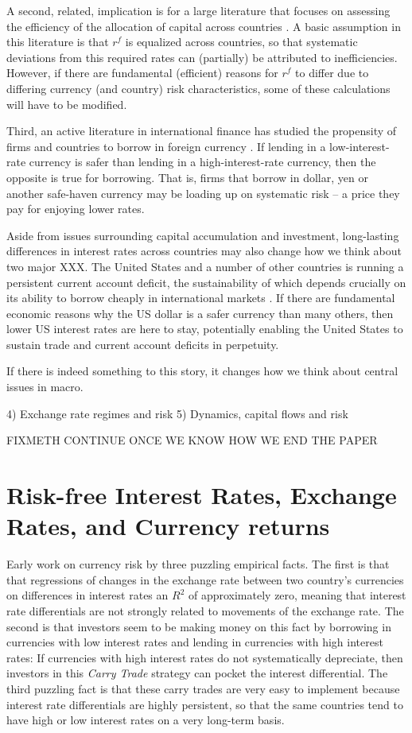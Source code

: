 \documentclass{ar-1col}
\begin{document}
A second, related, implication is for a large literature that focuses on assessing the efficiency of the allocation of capital across countries \citep{HallJones1997, CaselliFeyrer2007}. A basic assumption in this literature is that $r^f$ is equalized across countries, so that systematic deviations from this required rates can (partially) be attributed to inefficiencies. However, if there are fundamental (efficient) reasons for $r^f$ to differ due to differing currency (and country) risk characteristics, some of these calculations will have to be modified.

Third, an active literature in international finance has studied the propensity of firms and countries to borrow in foreign currency \citep{DuSchreger2016, KalemliOzcanetal2019}. If lending in a low-interest-rate currency is safer than lending in a high-interest-rate currency, then the opposite is true for borrowing. That is, firms that borrow in dollar, yen or another safe-haven currency may be loading up on systematic risk -- a price they pay for enjoying lower rates.

Aside from issues surrounding capital accumulation and investment, long-lasting differences in interest rates across countries may also change how we think about two major XXX. The United States and a number of other countries is running a persistent current account deficit, the sustainability of which depends crucially on its ability to borrow cheaply in international markets \citep{GourinchasRey2007}. If there are fundamental economic reasons why the US dollar is a safer currency than many others, then lower US interest rates are here to stay, potentially enabling the United States to sustain trade and current account deficits in perpetuity.

If there is indeed something to this story, it changes how we think
about central issues in macro.

 4) Exchange rate regimes and risk 5)
Dynamics, capital flows and risk

FIXMETH CONTINUE ONCE WE KNOW HOW WE END THE PAPER

\section{Risk-free Interest Rates, Exchange Rates, and Currency
  returns}

Early work on currency risk by three puzzling empirical facts. The first is that that regressions of changes in the exchange rate between two country's currencies on differences in interest rates an $R^2$ of approximately zero, meaning that interest rate differentials are not strongly related to movements of the exchange rate. The second is that investors seem to be making money on this fact by borrowing in currencies with low interest rates and lending in currencies with high interest rates: If currencies with high interest rates do not systematically depreciate, then investors in this \textit{Carry Trade} strategy can pocket the interest differential. The third puzzling fact is that these carry trades are very easy to implement because interest rate differentials are highly persistent, so that the same countries tend to have high or low interest rates on a very long-term basis.
\end{document}
